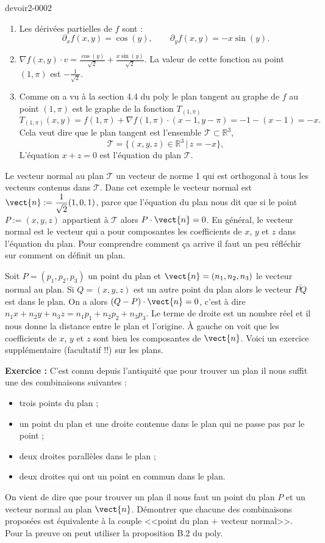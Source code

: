 \begin{corrige}{devoir2-0002}

  \begin{enumerate}
  \item Les dérivées partielles de $f$ sont :
    \[ \partial_x f(x,y)= \cos(y), \qquad \partial_y f (x,y)= -x\sin(y).\]
  \item $\displaystyle \nabla f(x,y)\cdot v= \frac{\cos(y)}{\sqrt{2}}+\frac{x\sin(y)}{\sqrt{2}}.$ La valeur de cette fonction au point $(1,\pi)$  est $-\frac{1}{\sqrt{2}}$.
  \item Comme on a vu à la section 4.4 du poly le plan tangent au graphe de $f$ au point $(1,\pi)$ est le graphe de la fonction $T_{(1,\pi)}$ 
    \[ T_{(1,\pi)}(x,y)= f(1,\pi) + \nabla f(1,\pi)\cdot (x-1, y-\pi)= -1- (x-1)= -x.\]
    Cela veut dire que le plan tangent est l'ensemble $\mathcal{T}\subset\mathbb{R}^3$, 
    \[\mathcal{T}=\{(x,y,z)\in \mathbb{R}^3\, \vert \, z=-x \},\]
    L'équation $x+z=0$ est l'équation du plan $\mathcal{T}$. 
  \end{enumerate}
  Le vecteur normal au plan $\mathcal{T}$ un vecteur de norme 1 qui est orthogonal à tous les vecteurs contenus dans $\mathcal{T}$. Dans cet exemple le vecteur normal est  $\displaystyle \vect{ n }:=\frac{1}{\sqrt{2}}(1,0,1)$, parce que l'équation du plan nous dit que si le point $P:=(x,y,z)$ appartient à $\mathcal{T}$ alors $P\cdot\vect{ n }=0$. 
  En général, le vecteur normal est le vecteur qui a pour composantes les coefficients de $x$, $y$ et $z$ dans l'équation du plan. Pour comprendre comment ça arrive il faut un peu réfléchir sur comment on définit un plan. 

  Soit $P=(p_1, p_2, p_3)$ un point du plan et $\vect{ n }=(n_1, n_2, n_3)$ le vecteur normal au plan. Si $Q= (x,y,z)$ est un autre point du plan alors le vecteur $\bar{PQ}$ est dans le plan. On a alors $(Q-P)\cdot \vect{n}=0$, c'est à dire $n_1x+n_2y+n_3z=n_1p_1+n_2p_2+n_3p_3$. Le terme de droite est un nombre réel et il nous donne la distance entre le plan et l'origine. À gauche on voit que les coefficients de $x$, $y$ et $z$ sont bien les composantes de $\vect{n}$.  
  Voici un exercice supplémentaire (facultatif !!) sur les plans.  
    
  \textbf{Exercice :} C'est connu depuis l'antiquité que pour trouver un plan il nous suffit une des combinaisons suivantes :
  \begin{itemize}
  \item trois points du plan ;
  \item un point du plan et une droite contenue dans le plan  qui ne passe pas par le point ;
  \item deux droites parallèles dans le plan ;
  \item deux droites qui ont un point en commun dans le plan.
  \end{itemize}
  On vient de dire que pour trouver un plan il nous faut un point du plan $P$ et un vecteur normal au plan  $\vect{ n }$. Démontrer que chacune des combinaisons proposées est équivalente à la couple <<point du plan $+$ vecteur normal>>. Pour la preuve on peut utiliser la proposition B.2 du poly.    

\end{corrige}
